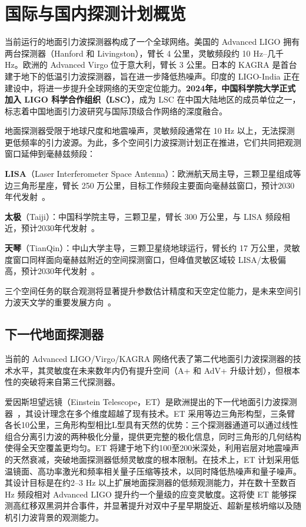 \section{国际与国内探测计划概览}

当前运行的地面引力波探测器构成了一个全球网络。美国的 Advanced LIGO 拥有两台探测器（Hanford 和 Livingston），臂长 4 公里，灵敏频段约 10 Hz--几千 Hz。欧洲的 Advanced Virgo 位于意大利，臂长 3 公里。日本的 KAGRA 是首台建于地下的低温引力波探测器，旨在进一步降低热噪声。印度的 LIGO-India 正在建设中，将进一步提升全球网络的天空定位能力。\textbf{2024年，中国科学院大学正式加入 LIGO 科学合作组织（LSC）}，成为 LSC 在中国大陆地区的成员单位之一，标志着中国地面引力波研究与国际顶级合作网络的深度融合。

地面探测器受限于地球尺度和地震噪声，灵敏频段通常在 10 Hz 以上，无法探测更低频率的引力波源。为此，多个空间引力波探测计划正在推进，它们共同把观测窗口延伸到毫赫兹频段：

\textbf{LISA}（Laser Interferometer Space Antenna）：欧洲航天局主导，三颗卫星组成等边三角形星座，臂长 250 万公里，目标工作频段主要面向毫赫兹窗口，预计2030年代发射~\cite{LISA2017proposal}。

\textbf{太极}（Taiji）：中国科学院主导，三颗卫星，臂长 300 万公里，与 LISA 频段相近，预计2030年代发射~\cite{Hu2017Taiji_NSR,Ruan2020Taiji_RiP,wang2024challenges}。

\textbf{天琴}（TianQin）：中山大学主导，三颗卫星绕地球运行，臂长约 17 万公里，灵敏度窗口同样面向毫赫兹附近的空间探测窗口，但峰值灵敏区域较 LISA/太极偏高，预计2030年代发射~\cite{Luo2016TianQin,Mei2021TianQin_PTEP}。

三个空间任务的联合观测将显著提升参数估计精度和天空定位能力，是未来空间引力波天文学的重要发展方向~\cite{du2026taiji}。

\subsection{下一代地面探测器}

当前的 Advanced LIGO/Virgo/KAGRA 网络代表了第二代地面引力波探测器的技术水平，其灵敏度在未来数年内仍有提升空间（A+ 和 AdV+ 升级计划），但根本性的突破将来自第三代探测器。

爱因斯坦望远镜（Einstein Telescope，ET）是欧洲提出的下一代地面引力波探测器~\cite{Punturo2010ET}，其设计理念在多个维度超越了现有技术。ET 采用等边三角形构型，三条臂各长10公里，三角形构型相比L型具有天然的优势：三个探测器通道可以通过线性组合分离引力波的两种极化分量，提供更完整的极化信息，同时三角形的几何结构使得全天空覆盖更均匀。ET 将建于地下约100至200米深处，利用岩层对地震噪声的天然衰减，突破地面探测器低频灵敏度的根本限制。在技术上，ET 计划采用低温镜面、高功率激光和频率相关量子压缩等技术，以同时降低热噪声和量子噪声。其设计目标是在约2--3 Hz 以上扩展地面探测器的低频观测能力，并在数十至数百 Hz 频段相对 Advanced LIGO 提升约一个量级的应变灵敏度。这将使 ET 能够探测高红移双黑洞并合事件，并显著提升对双中子星早期旋近、超新星核坍缩以及随机引力波背景的观测能力。

